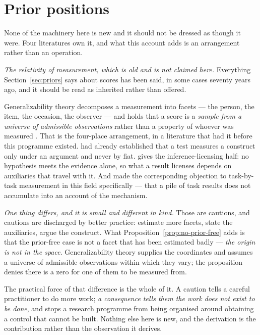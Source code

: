 \documentclass[11pt,a4paper]{article}
\theoremstyle{remark}
\begin{document}
\section{Prior positions}\label{sec:prior}
None of the machinery here is new and it should not be dressed as though it were. Four literatures own
it, and what this account adds is an arrangement rather than an operation.

\emph{The relativity of measurement, which is old and is not claimed here.} Everything
Section~\ref{sec:priors} says about scores has been said, in some cases seventy years ago, and it
should be read as inherited rather than offered.

Generalizability theory decomposes a measurement into facets --- the person, the item, the occasion,
the observer --- and holds that a score is a \emph{sample from a universe of admissible observations}
rather than a property of whoever was measured \citep{cronbach1972}. That is the four-place arrangement,
in a literature that had it before this programme existed. \citet{cronbach1955} had already established
that a test measures a construct only under an argument and never by fiat. \citet{quine1951} gives the
inference-licensing half: no hypothesis meets the evidence alone, so what a result licenses depends on
auxiliaries that travel with it. And \citet{newell1973} made the corresponding objection to
task-by-task measurement in this field specifically --- that a pile of task results does not accumulate
into an account of the mechanism.

\emph{One thing differs, and it is small and different in kind.} Those are cautions, and cautions are
discharged by better practice: estimate more facets, state the auxiliaries, argue the construct. What
Proposition~\ref{prop:no-prior-free} adds is that the prior-free case is not a facet that has been
estimated badly --- \emph{the origin is not in the space}. Generalizability theory supplies the
coordinates and assumes a universe of admissible observations within which they vary; the proposition
denies there is a zero for one of them to be measured from.

The practical force of that difference is the whole of it. A caution tells a careful practitioner to do
more work; \emph{a consequence tells them the work does not exist to be done}, and stops a research
programme from being organised around obtaining a control that cannot be built. Nothing else here is
new, and the derivation is the contribution rather than the observation it derives.
\end{document}
